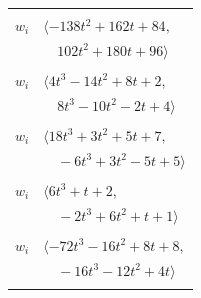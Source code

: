 \documentclass[11pt]{article}
\begin{document}
\begin{longtable}{@{}ll@{}}
\addlinespace[2pt]
\multicolumn{2}{@{}p{0.97\textwidth}@{}}{$i=22$, $D_i=8$, $\rho_{ij}$: $1{:}2, \allowbreak 3{:}1, \allowbreak 4{:}2, \allowbreak 7{:}2, \allowbreak 11{:}2, \allowbreak 12{:}1, \allowbreak 14{:}1, \allowbreak 16{:}1, \allowbreak 18{:}1, \allowbreak 23{:}1, \allowbreak 26{:}2, \allowbreak 32{:}1, \allowbreak 48{:}2$}\\
$w_i$ & $\langle -138t^{2}+162t+84,$\\
 & $\quad 102t^{2}+180t+96\rangle$\\
\addlinespace[2pt]
\multicolumn{2}{@{}p{0.97\textwidth}@{}}{$i=23$, $D_i=2$, $\rho_{ij}$: $2{:}1, \allowbreak 17{:}2, \allowbreak 22{:}2, \allowbreak 34{:}1, \allowbreak 39{:}1, \allowbreak 42{:}1, \allowbreak 43{:}2$}\\
$w_i$ & $\langle 4t^{3}-14t^{2}+8t+2,$\\
 & $\quad 8t^{3}-10t^{2}-2t+4\rangle$\\
\addlinespace[2pt]
\multicolumn{2}{@{}p{0.97\textwidth}@{}}{$i=24$, $D_i=2$, $\rho_{ij}$: $1{:}1, \allowbreak 2{:}2, \allowbreak 12{:}2, \allowbreak 14{:}2, \allowbreak 15{:}2, \allowbreak 17{:}1, \allowbreak 32{:}1, \allowbreak 34{:}1, \allowbreak 37{:}1, \allowbreak 38{:}1, \allowbreak 44{:}2$}\\
$w_i$ & $\langle 18t^{3}+3t^{2}+5t+7,$\\
 & $\quad -6t^{3}+3t^{2}-5t+5\rangle$\\
\addlinespace[2pt]
\multicolumn{2}{@{}p{0.97\textwidth}@{}}{$i=25$, $D_i=2$, $\rho_{ij}$: $7{:}1, \allowbreak 11{:}2, \allowbreak 17{:}1, \allowbreak 29{:}1, \allowbreak 40{:}2, \allowbreak 44{:}1, \allowbreak 49{:}2$}\\
$w_i$ & $\langle 6t^{3}+t+2,$\\
 & $\quad -2t^{3}+6t^{2}+t+1\rangle$\\
\addlinespace[2pt]
\multicolumn{2}{@{}p{0.97\textwidth}@{}}{$i=26$, $D_i=8$, $\rho_{ij}$: $2{:}1, \allowbreak 3{:}2, \allowbreak 7{:}2, \allowbreak 14{:}1, \allowbreak 17{:}1, \allowbreak 18{:}2, \allowbreak 20{:}2, \allowbreak 22{:}1, \allowbreak 34{:}1, \allowbreak 35{:}1, \allowbreak 36{:}2, \allowbreak 44{:}2, \allowbreak 45{:}1, \allowbreak 47{:}2$}\\
$w_i$ & $\langle -72t^{3}-16t^{2}+8t+8,$\\
 & $\quad -16t^{3}-12t^{2}+4t\rangle$\\
\addlinespace[2pt]
\multicolumn{2}{@{}p{0.97\textwidth}@{}}{$i=27$, $D_i=4$, $\rho_{ij}$: $2{:}1, \allowbreak 6{:}1, \allowbreak 7{:}1, \allowbreak 10{:}1, \allowbreak 13{:}2, \allowbreak 14{:}2, \allowbreak 16{:}1, \allowbreak 31{:}1, \allowbreak 38{:}2, \allowbreak 41{:}1$}\\

\end{longtable}
\end{document}
